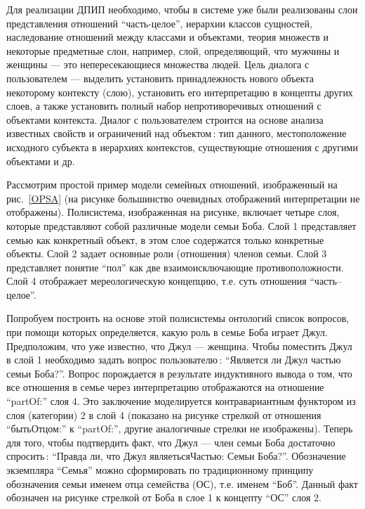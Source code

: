 \documentclass[utf8]{../IncArticle}
\newcommand{\e}[2][fcolor]{\textcolor{pcolor}{[}\textcolor{#1}{#2}\textcolor{pcolor}{]}}
\begin{document}
Для реализации ДПИП необходимо, чтобы в системе уже были реализованы
слои представления отношений ``часть-целое'', иерархии классов
сущностей, наследование отношений между классами и объектами, теория
множеств и некоторые предметные слои, например, слой, определяющий,
что мужчины и женщины --- это непересекающиеся множества людей.  Цель
диалога с пользователем --- выделить установить принадлежность нового
объекта некоторому контексту (слою), установить его интерпретацию в
концепты других слоев, а также установить полный набор
непротиворечивых отношений с объектами контекста.  Диалог с
пользователем строится на основе анализа известных свойств и
ограничений над объектом\,: тип данного, местоположение исходного
субъекта в иерархиях контекстов, существующие отношения с другими
объектами и др.


Рассмотрим простой пример модели семейных отношений, изображенный на
рис.~\ref{OPSA} (на рисунке большинство очевидных отображений
интерпретации не отображены).  Полисистема, изображенная на рисунке,
включает четыре слоя, которые представляют собой различные модели
семьи Боба.  Слой 1 представляет семью как конкретный объект, в этом
слое содержатся только конкретные объекты.  Слой 2 задает основные
роли (отношения) членов семьи. Слой 3 представляет понятие ``пол'' как
две взаимоисключающие противоположности.  Слой 4 отображает
мереологическую концепцию, т.е. суть отношения ``часть--целое''.

Попробуем построить на основе этой полисистемы онтологий список
вопросов, при помощи которых определяется, какую роль в семье Боба
играет Джул.  Предположим, что уже известно, что Джул --- женщина.
Чтобы поместить Джул в слой 1 необходимо задать вопрос пользователю\,:
``Является ли Джул частью семьи Боба?''.  Вопрос порождается в
результате индуктивного вывода о том, что все отношения в семье через
интерпретацию отображаются на отношение ``partOf:'' слоя 4.  Это
заключение моделируется контравариантным функтором из слоя (категории)
2 в слой 4 (показано на рисунке стрелкой от отношения ``бытьОтцом:'' к
``partOf:'', другие аналогичные стрелки не изображены).  Теперь для
того, чтобы подтвердить факт, что Джул --- член семьи Боба достаточно
спросить\,: ``Правда ли, что Джул являетьсяЧастью: Семьи Боба?''.
Обозначение экземпляра ``Семья'' можно сформировать по традиционному
принципу обозначения семьи именем отца семейства (ОС), т.е. именем
``Боб''.  Данный факт обозначен на рисунке стрелкой от Боба в слое 1 к
концепту ``ОС'' слоя 2.
\end{document}
